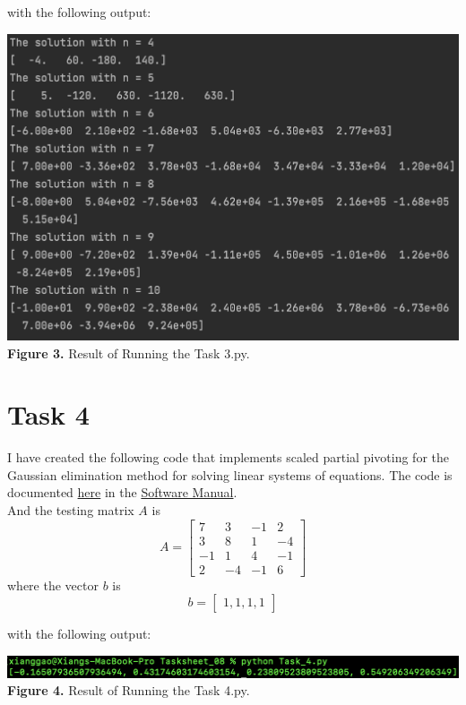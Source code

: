\documentclass{article}
\begin{document}
with the following output:
\begin{center}
\includegraphics[scale = 0.6]{Screenshots/3.png}\\
{\bf Figure 3.} Result of Running the Task 3.py.
\end{center}

\section*{Task 4}
I have created the following code that implements scaled partial pivoting for the Gaussian elimination method for solving linear systems of equations. The code is documented \href{hhttps://github.com/GoByMark/math4610/blob/main/Homework_Tasks/Tasksheet_08/src/Task_4.py}{here} in the \href{https://github.com/GoByMark/math4610/blob/main/Homework_Tasks/Software_Manual/Software_Manual_toc.md}{Software Manual}.\\
And the testing matrix $A$ is 
$$A = \begin{bmatrix}
7 & 3 & -1 & 2\\
3 & 8 &  1 & -4\\
-1 & 1 & 4 & -1\\
2 & -4 & -1 & 6
\end{bmatrix}$$ where the vector $b$ is
$$b = \begin{bmatrix}1, 1, 1, 1\end{bmatrix}$$

with the following output:
\begin{center}
\includegraphics[width=\textwidth]{Screenshots/4.png}\\
{\bf Figure 4.} Result of Running the Task 4.py.
\end{center}
\end{document}
